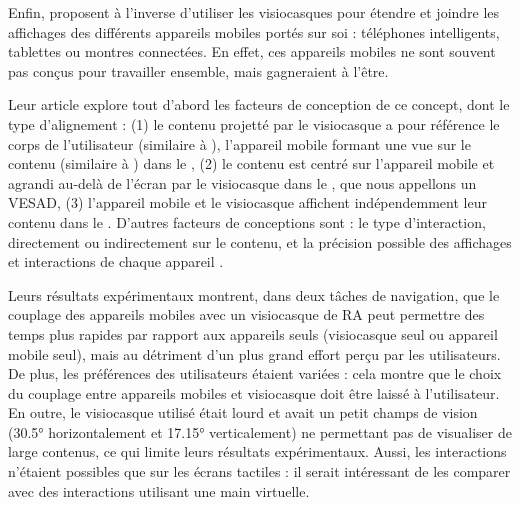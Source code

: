 
Enfin, \cite{Grubert2015} proposent à l'inverse d'utiliser les visiocasques pour étendre et joindre les affichages des différents appareils mobiles portés sur soi : téléphones intelligents, tablettes ou montres connectées. En effet, ces appareils mobiles ne sont souvent pas conçus pour travailler ensemble, mais gagneraient à l'être.

Leur article explore tout d'abord les facteurs de conception de ce concept, dont le type d'alignement  : (1) le contenu projetté par le visiocasque a pour référence le corps de l'utilisateur (similaire à \cite{Ens2014}), l'appareil mobile formant une vue  sur le contenu (similaire à \cite{Berge2014}) dans le , (2) le contenu est centré sur l'appareil mobile et agrandi au-delà de l'écran par le visiocasque dans le , que nous appellons un VESAD, (3) l'appareil mobile et le visiocasque affichent indépendemment leur contenu dans le . D'autres facteurs de conceptions sont : le type d'interaction, directement ou indirectement sur le contenu, et la précision possible des affichages et interactions de chaque appareil .

Leurs résultats expérimentaux montrent, dans deux tâches de navigation, que le couplage des appareils mobiles avec un visiocasque de RA peut permettre des temps plus rapides par rapport aux appareils seuls (visiocasque seul ou appareil mobile seul), mais au détriment d'un plus grand effort perçu par les utilisateurs. De plus, les préférences des utilisateurs étaient variées : cela montre que le choix du couplage entre appareils mobiles et visiocasque doit être laissé à l'utilisateur.
En outre, le visiocasque utilisé était lourd et avait un petit champs de vision (\ang{30.5} horizontalement et \ang{17.15} verticalement) ne permettant pas de visualiser de large contenus, ce qui limite leurs résultats expérimentaux. Aussi, les interactions n'étaient possibles que sur les écrans tactiles : il serait intéressant de les comparer avec des interactions utilisant une main virtuelle.



